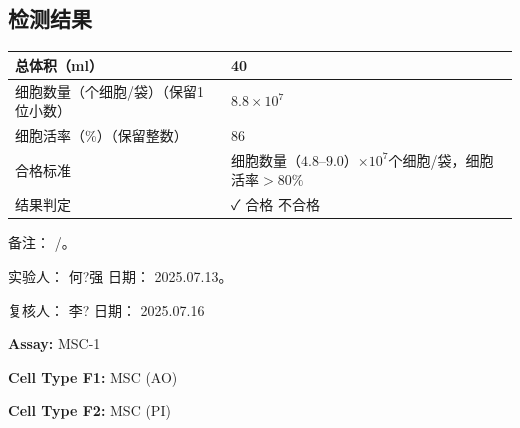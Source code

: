 \documentclass[UTF8,10pt,a4paper,fontset=fandol]{ctexart}
\newcommand{\fieldvalue}[1]{#1}
\newcommand{\handwritten}[1]{#1}
\begin{document}
\subsection*{检测结果}

\begin{tabularx}{\textwidth}{|l|X|}
\hline
总体积（ml） &
\fieldvalue{\handwritten{40}}\\
\hline
细胞数量（个细胞/袋）\newline（保留1位小数） &
\fieldvalue{\handwritten{$8.8\times10^{7}$}}\\
\hline
细胞活率（\%）\newline（保留整数） &
\fieldvalue{\handwritten{86}}\\
\hline
合格标准 &
细胞数量（$4.8$--$9.0$）$\times10^{7}$个细胞/袋，细胞活率$>80\%$\\
\hline
结果判定 &
\fieldvalue{\handwritten{✓ 合格}} \quad 不合格\\
\hline
\end{tabularx}

备注：
\fieldvalue{\handwritten{/}}。

实验人：
\fieldvalue{\handwritten{何?强}}
\qquad
日期：
\fieldvalue{\handwritten{2025.07.13}}。

复核人：
\fieldvalue{\handwritten{李?}}
\qquad
日期：
\fieldvalue{\handwritten{2025.07.16}}

\newpage

\noindent
\textbf{Assay:}
\fieldvalue{MSC-1}

\medskip

\noindent
\textbf{Cell Type F1:}
\fieldvalue{MSC (AO)}

\noindent
\textbf{Cell Type F2:}
\fieldvalue{MSC (PI)}
\end{document}

